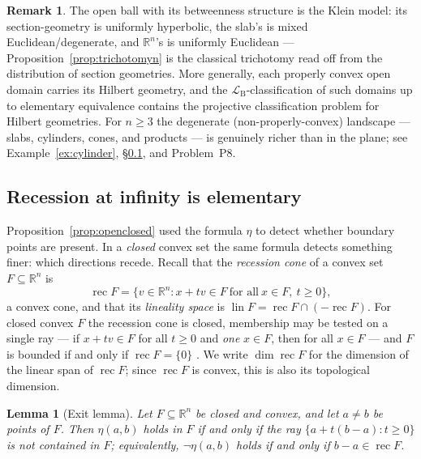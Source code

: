 \documentclass[11pt]{amsart}
\newtheorem{lemma}[theorem]{Lemma}
\theoremstyle{definition}
\newtheorem{remark}[theorem]{Remark}
\newcommand{\R}{\mathbb{R}}
\newcommand{\LB}{\mathcal{L}_{\mathrm{B}}}
\newcommand{\rec}{\operatorname{rec}}
\newcommand{\lin}{\operatorname{lin}}
\begin{document}
\begin{remark}
The open ball with its betweenness structure is the Klein model: its
section-geometry is uniformly hyperbolic, the slab's is mixed
Euclidean/degenerate, and $\R^n$'s is uniformly Euclidean ---
Proposition~\ref{prop:trichotomyn} is the classical trichotomy read off from
the distribution of section geometries. More generally, each properly convex
open domain carries its Hilbert geometry, and the $\LB$-classification of
such domains up to elementary equivalence contains the projective
classification problem for Hilbert geometries. For $n\ge3$ the degenerate
(non-properly-convex) landscape --- slabs, cylinders, cones, and products ---
is genuinely richer than in the plane; see Example~\ref{ex:cylinder},
\S\ref{subsec:recession}, and Problem~P8.
\end{remark}

\subsection{Recession at infinity is elementary}\label{subsec:recession}

Proposition~\ref{prop:openclosed} used the formula $\eta$ to detect whether
boundary points are present. In a \emph{closed} convex set the same formula
detects something finer: which directions recede. Recall that the
\emph{recession cone} of a convex set $F\subseteq\R^n$ is
\[
\rec F=\{v\in\R^n:x+tv\in F\ \text{for all}\ x\in F,\ t\ge0\},
\]
a convex cone, and that its \emph{lineality space} is
$\lin F=\rec F\cap(-\rec F)$. For closed convex $F$ the recession cone is
closed, membership may be tested on a single ray --- if $x+tv\in F$ for all
$t\ge0$ and \emph{one} $x\in F$, then for all $x\in F$ --- and $F$ is bounded
if and only if $\rec F=\{0\}$ \cite[Theorems~8.3 and~8.4]{Rockafellar70}. We
write $\dim\rec F$ for the dimension of the linear span of $\rec F$; since
$\rec F$ is convex, this is also its topological dimension.

\begin{lemma}[Exit lemma]\label{lem:exit}
Let $F\subseteq\R^n$ be closed and convex, and let $a\ne b$ be points of $F$.
Then $\eta(a,b)$ holds in $F$ if and only if the ray
$\{a+t(b-a):t\ge0\}$ is not contained in $F$; equivalently, $\neg\eta(a,b)$
holds if and only if $b-a\in\rec F$.
\end{lemma}
\end{document}
